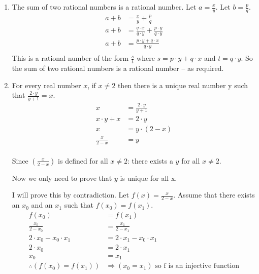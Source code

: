 \documentclass[10pt,\jkfside,a4paper]{article}
\begin{document}
\begin{enumerate}
\item The sum of two rational numbers is a rational number.
Let $a = \frac{x}{y}$. Let $b = \frac{p}{q}$.
\begin{equation}
\begin{split}
a + b &= \frac{x}{y} + \frac{p}{q}\\
a + b &= \frac{q\cdot x}{q\cdot y} + \frac{p\cdot y}{q\cdot y}\\
a + b &= \frac{p\cdot y + q\cdot x}{q\cdot y}\\
\end{split}
\end{equation}
This is a rational number of the form $\frac{s}{t}$ where $s=p\cdot y 
+ q\cdot x$ and $t = q\cdot y$. So the sum of two rational numbers is a rational 
number -- as required.

\item For every real number $x$, if $x \neq 2$ then there is a unique real 
number y such that $\frac{2\cdot y}{y + 1} = x$.
\begin{equation}
\begin{split}
x &= \frac{2\cdot y}{y + 1}\\
x\cdot y + x &= 2\cdot y\\
x &= y\cdot (2 - x)\\
\frac{x}{2 - x} &= y\\
\end{split}
\end{equation}

Since $(\frac{x}{2 - x})$ is defined for all $x\neq 2$: there exists a $y$ for 
all $x\neq 2$.

Now we only need to prove that $y$ is unique for all x.

I will prove this by contradiction. Let $f(x) = \frac{x}{2 - x}$. Assume that 
there exists an $x_0$ and an 
$x_1$ such that $f(x_0) = f(x_1)$.
\begin{equation}
\begin{split}
f(x_0) &= f(x_1)\\
\frac{x_0}{2 - x_0} &= \frac{x_1}{2 - x_1}\\
2\cdot x_0 - x_0\cdot x_1 &= 2\cdot x_1 - x_0 \cdot x_1\\
2\cdot x_0 &= 2\cdot x_1\\
x_0 &= x_1\\
\therefore (f(x_0)= f(x_1))&\Longrightarrow (x_0 = x_1) \text{ so f is an injective function}\\
\end{split}
\end{equation}


\end{enumerate}
\end{document}
